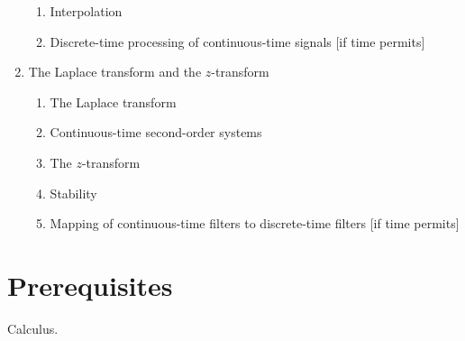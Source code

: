 \documentclass[11pt, a4paper]{article}
\begin{document}
\begin{multicols}{2}
\begin{enumerate}
\begin{enumerate}
    \item Interpolation
    \item Discrete-time processing of continuous-time signals [if time permits]
  \end{enumerate}
  \item The Laplace transform and the $z$-transform
  \begin{enumerate}
    \item The Laplace transform
    \item Continuous-time second-order systems
    \item The $z$-transform
    \item Stability
    \item Mapping of continuous-time filters to discrete-time filters [if time permits]
  \end{enumerate}
\end{enumerate}
\end{multicols}
\section{Prerequisites}
Calculus.
\end{document}
